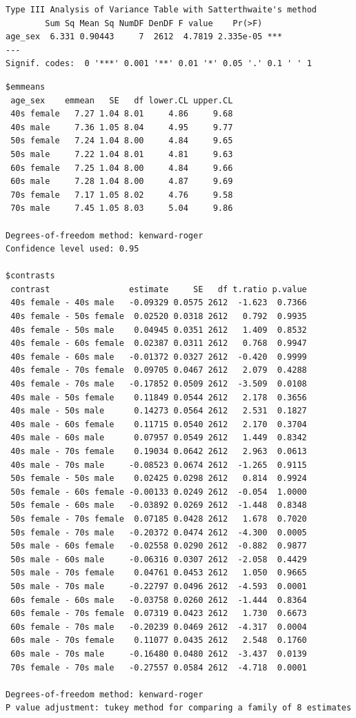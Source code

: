 \documentclass[
  letterpaper,
  DIV=11,
  numbers=noendperiod]{scrartcl}
\begin{document}
\begin{verbatim}
Type III Analysis of Variance Table with Satterthwaite's method
        Sum Sq Mean Sq NumDF DenDF F value    Pr(>F)    
age_sex  6.331 0.90443     7  2612  4.7819 2.335e-05 ***
---
Signif. codes:  0 '***' 0.001 '**' 0.01 '*' 0.05 '.' 0.1 ' ' 1
\end{verbatim}

\begin{verbatim}
$emmeans
 age_sex    emmean   SE   df lower.CL upper.CL
 40s female   7.27 1.04 8.01     4.86     9.68
 40s male     7.36 1.05 8.04     4.95     9.77
 50s female   7.24 1.04 8.00     4.84     9.65
 50s male     7.22 1.04 8.01     4.81     9.63
 60s female   7.25 1.04 8.00     4.84     9.66
 60s male     7.28 1.04 8.00     4.87     9.69
 70s female   7.17 1.05 8.02     4.76     9.58
 70s male     7.45 1.05 8.03     5.04     9.86

Degrees-of-freedom method: kenward-roger 
Confidence level used: 0.95 

$contrasts
 contrast                estimate     SE   df t.ratio p.value
 40s female - 40s male   -0.09329 0.0575 2612  -1.623  0.7366
 40s female - 50s female  0.02520 0.0318 2612   0.792  0.9935
 40s female - 50s male    0.04945 0.0351 2612   1.409  0.8532
 40s female - 60s female  0.02387 0.0311 2612   0.768  0.9947
 40s female - 60s male   -0.01372 0.0327 2612  -0.420  0.9999
 40s female - 70s female  0.09705 0.0467 2612   2.079  0.4288
 40s female - 70s male   -0.17852 0.0509 2612  -3.509  0.0108
 40s male - 50s female    0.11849 0.0544 2612   2.178  0.3656
 40s male - 50s male      0.14273 0.0564 2612   2.531  0.1827
 40s male - 60s female    0.11715 0.0540 2612   2.170  0.3704
 40s male - 60s male      0.07957 0.0549 2612   1.449  0.8342
 40s male - 70s female    0.19034 0.0642 2612   2.963  0.0613
 40s male - 70s male     -0.08523 0.0674 2612  -1.265  0.9115
 50s female - 50s male    0.02425 0.0298 2612   0.814  0.9924
 50s female - 60s female -0.00133 0.0249 2612  -0.054  1.0000
 50s female - 60s male   -0.03892 0.0269 2612  -1.448  0.8348
 50s female - 70s female  0.07185 0.0428 2612   1.678  0.7020
 50s female - 70s male   -0.20372 0.0474 2612  -4.300  0.0005
 50s male - 60s female   -0.02558 0.0290 2612  -0.882  0.9877
 50s male - 60s male     -0.06316 0.0307 2612  -2.058  0.4429
 50s male - 70s female    0.04761 0.0453 2612   1.050  0.9665
 50s male - 70s male     -0.22797 0.0496 2612  -4.593  0.0001
 60s female - 60s male   -0.03758 0.0260 2612  -1.444  0.8364
 60s female - 70s female  0.07319 0.0423 2612   1.730  0.6673
 60s female - 70s male   -0.20239 0.0469 2612  -4.317  0.0004
 60s male - 70s female    0.11077 0.0435 2612   2.548  0.1760
 60s male - 70s male     -0.16480 0.0480 2612  -3.437  0.0139
 70s female - 70s male   -0.27557 0.0584 2612  -4.718  0.0001

Degrees-of-freedom method: kenward-roger 
P value adjustment: tukey method for comparing a family of 8 estimates 
\end{verbatim}
\end{document}
